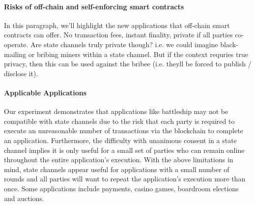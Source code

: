 \documentclass{llncs}
\begin{document}
	\paragraph{Risks of off-chain and self-enforcing smart contracts}
	In this paragraph, we'll highlight the new applications that off-chain smart contracts can offer. No transaction fees, instant finality, private if all parties co-operate. Are state channels truly private though? i.e. we could imagine black-mailing or bribing miners within a state channel. But if the context requries true privacy, then this can be used against the bribee (i.e. theyll be forced to publish / disclose it). 
	
	\paragraph{Applicable Applications} 
	Our experiment demonstrates that applications like battleship may not be compatible with state channels due to the risk that each party is required to execute an unreasonable number of transactions via the blockchain to complete an application. 
	Furthermore, the difficulty with unanimous consent in a state channel implies it is only useful for a small set of parties who can remain online throughout the entire application's execution. 
	With the above limitations in mind, state channels appear useful for applications with a small number of rounds and all parties will want to repeat the application's execution more than once. 
	Some applications include payments, casino games, boardroom elections and auctions.
	
\end{document}
